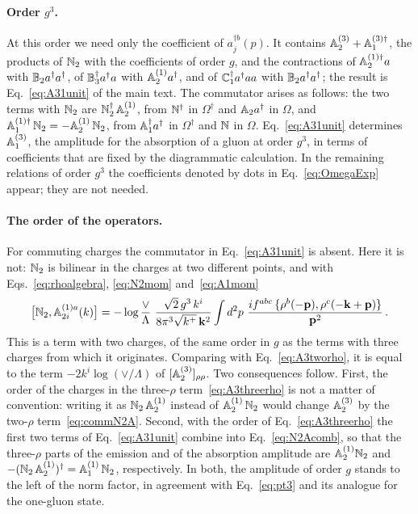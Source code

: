 \paragraph{Order $g^3$.} At this order we need only the coefficient of $a^{\dagger b}_j(p)$. It contains $\mathbb{A}^{(3)}_2+\mathbb{A}^{(3)\dagger}_1$, the products of $\mathbb{N}_2$ with the coefficients of order $g$, and the contractions of $\mathbb{A}^{(1)\dagger}_2a$ with $\mathbb{B}_2a^\dagger a^\dagger$, of $\mathbb{B}_3^\dagger a^\dagger a$ with $\mathbb{A}^{(1)}_2a^\dagger$, and of $\mathbb{C}_1^\dagger a^\dagger aa$ with $\mathbb{B}_2a^\dagger a^\dagger$; the result is Eq.~\eqref{eq:A31unit} of the main text.
The commutator arises as follows: the two terms with $\mathbb{N}_2$ are $\mathbb{N}_2^\dagger\,\mathbb{A}^{(1)}_2$, from $\mathbb{N}^\dagger$ in $\Omega^\dagger$ and $\mathbb{A}_2a^\dagger$ in $\Omega$, and $\mathbb{A}^{(1)\dagger}_1\,\mathbb{N}_2=-\mathbb{A}^{(1)}_2\,\mathbb{N}_2$, from $\mathbb{A}_1^\dagger a^\dagger$ in $\Omega^\dagger$ and $\mathbb{N}$ in $\Omega$. Eq.~\eqref{eq:A31unit} determines $\mathbb{A}^{(3)}_1$, the amplitude for the absorption of a gluon at order $g^3$, in terms of coefficients that are fixed by the diagrammatic calculation. In the remaining relations of order $g^3$ the coefficients denoted by dots in Eq.~\eqref{eq:OmegaExp} appear; they are not needed.

\paragraph{The order of the operators.} For commuting charges the commutator in Eq.~\eqref{eq:A31unit} is absent. Here it is not: $\mathbb{N}_2$ is bilinear in the charges at two different points, and with Eqs.~\eqref{eq:rhoalgebra}, \eqref{eq:N2mom} and~\eqref{eq:A1mom}
\begin{align}\label{eq:commN2A}
\big[\mf N_2,\mf A^{(1)a}_{2i}(k)\big]=-\log\frac{\vee}{\Lambda}\ \frac{\sqrt2\,g^3\,k^i}{8\pi^3\sqrt{k^+}\,\v k^2}\int d^2p\ \frac{if^{abc}\,\{\rho^b(-\v p),\rho^c(-\v k+\v p)\}}{\v p^2}\,.
\end{align}
This is a term with two charges, of the same order in $g$ as the terms with three charges from which it originates. Comparing with Eq.~\eqref{eq:A3tworho}, it is equal to the term $-2k^i\log(\vee/\Lambda)$ of $[\mathbb{A}^{(3)}_2]_{\rho\rho}$. Two consequences follow. First, the order of the charges in the three-$\rho$ term~\eqref{eq:A3threerho} is not a matter of convention: writing it as $\mathbb{N}_2\,\mathbb{A}^{(1)}_2$ instead of $\mathbb{A}^{(1)}_2\,\mathbb{N}_2$ would change $\mathbb{A}^{(3)}_2$ by the two-$\rho$ term~\eqref{eq:commN2A}. Second, with the order of Eq.~\eqref{eq:A3threerho} the first two terms of Eq.~\eqref{eq:A31unit} combine into Eq.~\eqref{eq:N2Acomb},
so that the three-$\rho$ parts of the emission and of the absorption amplitude are $\mathbb{A}^{(1)}_2\mathbb{N}_2$ and $-(\mathbb{N}_2\,\mathbb{A}^{(1)}_2)^\dagger=\mathbb{A}^{(1)}_1\,\mathbb{N}_2$, respectively. In both, the amplitude of order $g$ stands to the left of the norm factor, in agreement with Eq.~\eqref{eq:pt3} and its analogue for the one-gluon state.


